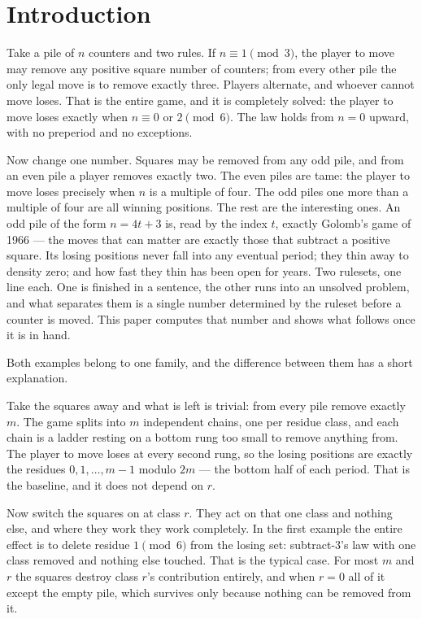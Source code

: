 \section{Introduction}\label{sec:intro}
Take a pile of $n$ counters and two rules. If $n \equiv 1 \pmod 3$, the
player to move may remove any positive square number of counters; from
every other pile the only legal move is to remove exactly three. Players
alternate, and whoever cannot move loses. That is the entire game, and it
is completely solved: the player to move loses exactly when $n \equiv 0$
or $2 \pmod 6$. The law holds from $n = 0$ upward, with no preperiod and
no exceptions.

Now change one number. Squares may be removed from any odd pile, and from
an even pile a player removes exactly two. The even piles are tame: the
player to move loses precisely when $n$ is a multiple of four. The odd
piles one more than a multiple of four are all winning positions. The rest
are the interesting ones. An odd pile of the form $n = 4t + 3$ is, read by
the index $t$, exactly Golomb's game of 1966 --- the moves that can matter
are exactly those that subtract a positive square. Its losing positions
never fall into any eventual period; they thin away to density zero; and
how fast they thin has been open for years. Two rulesets, one line each.
One is finished in a sentence, the other runs into an unsolved problem,
and what separates them is a single number determined by the ruleset
before a counter is moved. This paper computes that number and shows what
follows once it is in hand.

Both examples belong to one family, and the difference between them has a
short explanation.

Take the squares away and what is left is trivial: from every pile remove
exactly $m$. The game splits into $m$ independent chains, one per residue
class, and each chain is a ladder resting on a bottom rung too small to
remove anything from. The player to move loses at every second rung, so
the losing positions are exactly the residues $0, 1, \ldots, m-1$ modulo
$2m$ --- the bottom half of each period. That is the baseline, and it does
not depend on $r$.

Now switch the squares on at class $r$. They act on that one class and
nothing else, and where they work they work completely. In the first
example the entire effect is to delete residue $1 \pmod 6$ from the losing
set: subtract-$3$'s law with one class removed and nothing else touched.
That is the typical case. For most $m$ and $r$ the squares destroy class
$r$'s contribution entirely, and when $r = 0$ all of it except the empty
pile, which survives only because nothing can be removed from it.

